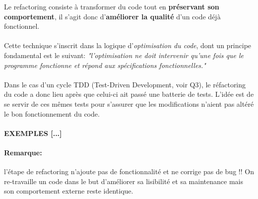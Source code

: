 \item{}
{Le refactoring consiste à transformer du code tout en \textbf{préservant son comportement}, il s'agit donc d'\textbf{améliorer la qualité} d'un code déjà fonctionnel.
\paragraph{}
Cette technique s'inscrit dans la logique d'\textit{optimisation du code}, dont un principe fondamental est le suivant: \textit{"l'optimisation ne doit intervenir qu'une fois que le programme fonctionne et répond aux spécifications fonctionnelles."}
\paragraph{}
Dans le cas d'un cycle TDD (Test-Driven Development, voir Q3), le réfactoring du code a donc lieu après que celui-ci ait passé une batterie de tests. L'idée est de se servir de ces mêmes tests pour s'assurer que les modifications n'aient pas altéré le bon fonctionnement du code.

\paragraph{EXEMPLES [...]}

\paragraph{Remarque: }
l'étape de refactoring n'ajoute pas de fonctionnalité et ne corrige pas de bug !! On re-travaille un code dans le but d'améliorer sa lisibilité et sa maintenance mais son comportement externe reste identique.

}

\item{}
{}

\item{}
{}

\item{}
{}

\item{}
{}

\item{}
{}